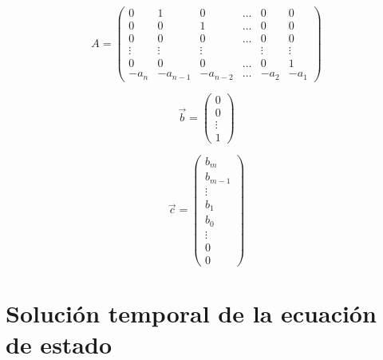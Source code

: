     \begin{equation}
        A =
        \begin{pmatrix}
        0 & 1 & 0 & \dots & 0 & 0 \\
        0 & 0 & 1 & \dots & 0 & 0 \\
        0 & 0 & 0 & \dots & 0 & 0 \\
        \vdots & \vdots & \vdots &   & \vdots & \vdots \\
        0 & 0 & 0 & \dots & 0 & 1 \\
        -a_n & -a_{n-1} & -a_{n-2} & \dots & -a_2 & -a_1
        \end{pmatrix}
    \end{equation}

    \begin{equation}
        \vec{b} =
        \begin{pmatrix}
        0 \\
        0 \\
        \vdots \\
        1
        \end{pmatrix}
    \end{equation}

    \begin{equation}
        \vec{c} =
        \begin{pmatrix}
        b_m     \\
        b_{m-1} \\
        \vdots  \\
        b_1     \\
        b_0     \\
        \vdots  \\
        0       \\
        0
        \end{pmatrix}
    \end{equation}

    \section{Solución temporal de la ecuación de estado}

